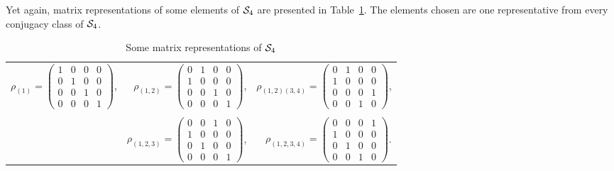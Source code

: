 	\begin{example}
		Yet again, matrix representations of some elements of $\mathcal{S}_4$ are presented in Table~\ref{table:permS4}. The elements chosen are one representative from every conjugacy class of $\mathcal{S}_4$.
		\begin{table}[hbt!]
			\centering
			\begin{tabular}{r r r}
				$\rho_{(1)} = \left(\begin{smallmatrix}
					1 & 0 & 0 & 0 \\
					0 & 1 & 0 & 0 \\
					0 & 0 & 1 & 0 \\
					0 & 0 & 0 & 1
				\end{smallmatrix}\right)$,  &
				$\rho_{(1,2)} = \left(\begin{smallmatrix}
					0 & 1 & 0 & 0 \\
					1 & 0 & 0 & 0 \\
					0 & 0 & 1 & 0 \\
					0 & 0 & 0 & 1
				\end{smallmatrix}\right)$, &
				$\rho_{(1,2)(3,4)} = \left(\begin{smallmatrix}
					0 & 1 & 0 & 0 \\
					1 & 0 & 0 & 0 \\
					0 & 0 & 0 & 1 \\
					0 & 0 & 1 & 0
				\end{smallmatrix}\right)$, \\ & & \\ &
				$\rho_{(1,2,3)} = \left(\begin{smallmatrix}
					0 & 0 & 1 & 0 \\
					1 & 0 & 0 & 0 \\
					0 & 1 & 0 & 0 \\
					0 & 0 & 0 & 1
				\end{smallmatrix}\right)$, &
				$\rho_{(1,2,3,4)} = \left(\begin{smallmatrix}
					0 & 0 & 0 & 1 \\
					1 & 0 & 0 & 0 \\
					0 & 1 & 0 & 0 \\
					0 & 0 & 1 & 0
				\end{smallmatrix}\right)$.
			\end{tabular}
			\caption{Some matrix representations of $\mathcal{S}_4$}
			\label{table:permS4}
		\end{table}
	\end{example}

